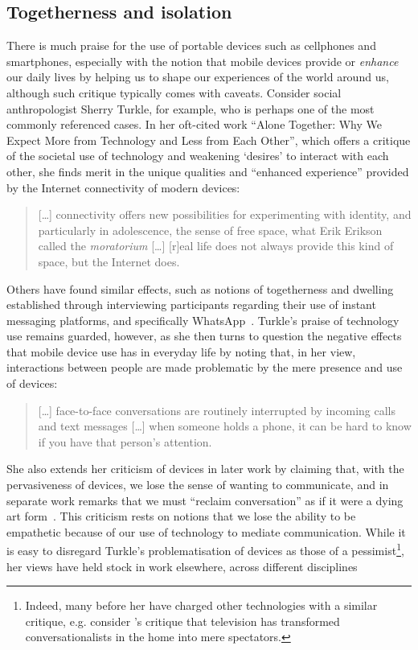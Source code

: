 \subsection{Togetherness and isolation}\label{sec:background litreview society together}
There is much praise for the use of portable devices such as cellphones and smartphones, especially with the notion that mobile devices provide or \textit{enhance} our daily lives by helping us to shape our experiences of the world around us, although such critique typically comes with caveats.
Consider social anthropologist Sherry Turkle, for example, who is perhaps one of the most commonly referenced cases.
In her oft-cited work ``Alone Together: Why We Expect More from Technology and Less from Each Other'', which offers a critique of the societal use of technology and weakening `desires' to interact with each other, she finds merit in the unique qualities and ``enhanced experience'' provided by the Internet connectivity of modern devices:
\begin{quote}
    [\ldots{}] connectivity offers new possibilities for experimenting with identity, and particularly in adolescence, the sense of free space, what Erik Erikson called the \textit{moratorium} [\ldots{}] [r]eal life does not always provide this kind of space, but the Internet does.
\end{quote}
Others have found similar effects, such as notions of togetherness and dwelling established through interviewing participants regarding their use of instant messaging platforms, and specifically WhatsApp~\citep{OHara2014}.
Turkle's praise of technology use remains guarded, however, as she then turns to question the negative effects that mobile device use has in everyday life by noting that, in her view, interactions between people are made problematic by the mere presence and use of devices:
\begin{quote}
    [\ldots{}] face-to-face conversations are routinely interrupted by incoming calls and text messages [\ldots] when someone holds a phone, it can be hard to know if you have that person's attention.
\end{quote}
\label{line:reclaimingconv}She also extends her criticism of devices in later work by claiming that, with the pervasiveness of devices, we lose the sense of wanting to communicate, and in separate work remarks that we must ``reclaim conversation'' as if it were a dying art form~\citep{Turkle2015}.
This criticism rests on notions that we lose the ability to be empathetic because of our use of technology to mediate communication.
While it is easy to disregard Turkle's problematisation of devices as those of a pessimist\footnote{Indeed, many before her have charged other technologies with a similar critique, e.g. consider \citet{McDonagh1950}'s critique that television has transformed conversationalists in the home into mere spectators.}, her views have held stock in work elsewhere, across different disciplines

